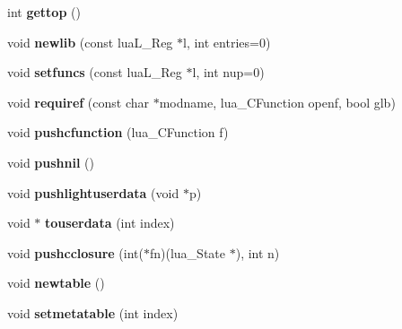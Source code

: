 \begin{DoxyCompactItemize}
\mbox{\label{classlua_1_1State_a6c211871187978af27fab76d8737e120}} 
int {\bfseries gettop} ()
\item 
\mbox{\label{classlua_1_1State_adbf92f3f483fea8ac70d58d4c5ad06ce}} 
void {\bfseries newlib} (const lua\+L\+\_\+\+Reg $\ast$l, int entries=0)
\item 
\mbox{\label{classlua_1_1State_a0f6789f0f3ed289d18dec8b74adc363f}} 
void {\bfseries setfuncs} (const lua\+L\+\_\+\+Reg $\ast$l, int nup=0)
\item 
\mbox{\label{classlua_1_1State_a8971a613aa3486fae93fd17bb59ec538}} 
void {\bfseries requiref} (const char $\ast$modname, lua\+\_\+\+C\+Function openf, bool glb)
\item 
\mbox{\label{classlua_1_1State_a88ec520c2ecccc598b592e5c8f3fc81f}} 
void {\bfseries pushcfunction} (lua\+\_\+\+C\+Function f)
\item 
\mbox{\label{classlua_1_1State_a274c3ce8a58e9082bda2a92fea890c1c}} 
void {\bfseries pushnil} ()
\item 
\mbox{\label{classlua_1_1State_a72674c84e98aadea69eafd5424789a7f}} 
void {\bfseries pushlightuserdata} (void $\ast$p)
\item 
\mbox{\label{classlua_1_1State_a858c8fbd31b49f540b0c6d6a4a4ceca4}} 
void $\ast$ {\bfseries touserdata} (int index)
\item 
\mbox{\label{classlua_1_1State_a67a47a69089a119843e2238ad5d3dfc4}} 
void {\bfseries pushcclosure} (int($\ast$fn)(lua\+\_\+\+State $\ast$), int n)
\item 
\mbox{\label{classlua_1_1State_a4b23c6d654d2e7072406e86be68d89f1}} 
void {\bfseries newtable} ()
\item 
\mbox{\label{classlua_1_1State_ab0b644f91f9855336dd8e8612e9effa4}} 
void {\bfseries setmetatable} (int index)
\item 
\mbox{\label{classlua_1_1State_ae6d5c8c2c31f174e54fa3d20d88eb889}} 

\end{DoxyCompactItemize}
